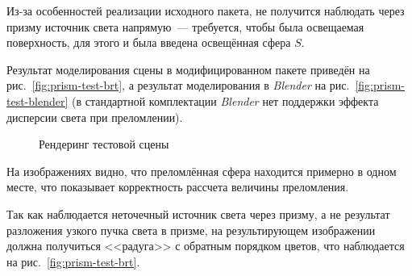 \documentclass[a4paper,10pt]{article}
\begin{document}
Из-за особенностей реализации исходного пакета, не получится наблюдать через призму источник света напрямую~---
требуется, чтобы была освещаемая поверхность, для этого и была введена освещённая сфера $S$.

Результат моделирования сцены в модифицированном пакете приведён на рис.~\ref{fig:prism-test-brt},
а результат моделирования в \textit{Blender} на рис.~\ref{fig:prism-test-blender} 
(в стандартной комплектации \textit{Blender} нет поддержки эффекта дисперсии света при преломлении).
\begin{figure}
  \centering
  \quad
  \caption{Рендеринг тестовой сцены}
  \label{fig:prism-test-results}
\end{figure}

На изображениях видно, что преломлённая сфера находится примерно в одном месте, 
что показывает корректность рассчета величины преломления.

Так как наблюдается неточечный источник света через призму,
а не результат разложения узкого пучка света в призме, 
на результирующем изображении должна получиться <<радуга>> с обратным порядком цветов, 
что наблюдается на рис.~\ref{fig:prism-test-brt}.
\end{document}
